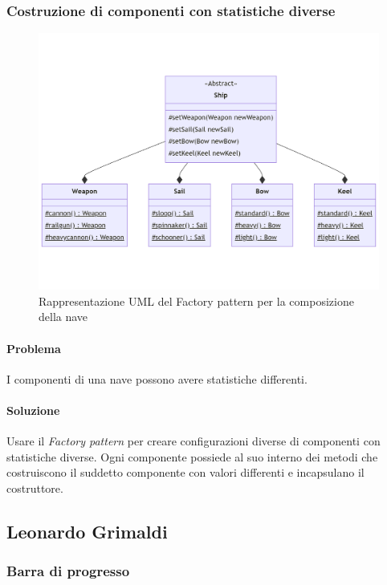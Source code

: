 \documentclass[a4paper,12pt]{report}
\begin{document}
\subsubsection*{Costruzione di componenti con statistiche diverse}

\begin{figure}[H]
	\centering{}
	\includegraphics[width=\textwidth]{img/Factory.png}
	\caption{Rappresentazione UML del Factory pattern per la composizione della nave}
	\label{img:Factory}
\end{figure}

\paragraph{Problema} I componenti di una nave possono avere statistiche differenti.
\paragraph{Soluzione} Usare il \textit{Factory pattern} per creare configurazioni diverse di componenti con statistiche diverse.
%
Ogni componente possiede al suo interno dei metodi che costruiscono il suddetto componente con valori differenti e incapsulano il costruttore.

\subsection*{Leonardo Grimaldi}
\subsubsection*{Barra di progresso}
\end{document}
